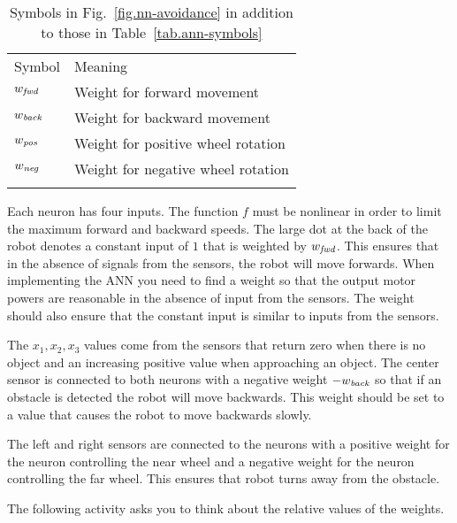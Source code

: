 \begin{table}
\caption{Symbols in Fig.~\ref{fig.nn-avoidance} in addition to those in Table~\ref{tab.ann-symbols}}
\label{tab.obstacle-avoidance}
\begin{tabular}{p{2cm}p{5.5cm}}
\hline\noalign{\smallskip}
Symbol & Meaning \\
\noalign{\smallskip}\hline\noalign{\smallskip}
$w_{\textit{\scriptsize fwd}}$ & Weight for forward movement\\
$w_{\textit{\scriptsize back}}$ & Weight for backward movement\\
$w_{\textit{\scriptsize pos}}$ & Weight for positive wheel rotation\\
$w_{\textit{\scriptsize neg}}$ & Weight for negative wheel rotation\\
\noalign{\smallskip}\hline\noalign{\smallskip}
\end{tabular}
\end{table}

Each neuron has four inputs. The function $f$ must be nonlinear in order to limit the maximum forward and backward speeds. The large dot at the back of the robot denotes a constant input of $1$ that is weighted by $w_{\textit{\scriptsize fwd}}$. This ensures that in the absence of signals from the sensors, the robot will move forwards. When implementing the ANN you need to find a weight so that the output motor powers are reasonable in the absence of input from the sensors. The weight should also ensure that the constant input is similar to inputs from the sensors.

The $x_1, x_2, x_3$ values come from the sensors that return zero when there is no object and an increasing positive value when approaching an object. The center sensor is connected to both neurons with a negative weight $-w_{\textit{\scriptsize back}}$ so that if an obstacle is detected the robot will move backwards. This weight should be set to a value that causes the robot to move backwards slowly.

The left and right sensors are connected to the neurons with a positive weight for the neuron controlling the near wheel and a negative weight for the neuron controlling the far wheel. This ensures that robot turns away from the obstacle.

The following activity asks you to think about the relative values of the weights.

